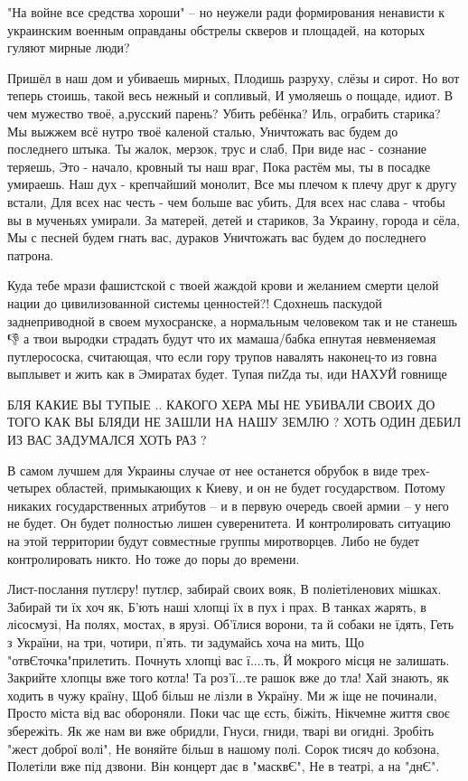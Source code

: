 "На войне все средства хороши" – но неужели ради формирования ненависти к
украинским военным оправданы обстрелы скверов и площадей, на которых гуляют
мирные люди?

Пришёл в наш дом и убиваешь мирных,
Плодишь разруху, слёзы и сирот.
Но вот теперь стоишь, такой весь нежный и сопливый,
И умоляешь о пощаде, идиот.
В чем мужество твоё, а,русский парень?
Убить ребёнка? Иль, ограбить старика?
Мы выжжем всё нутро твоё каленой сталью,
Уничтожать вас будем до последнего штыка.
Ты жалок, мерзок, трус и слаб,
При виде нас - сознание теряешь,
Это - начало, кровный ты наш враг,
Пока растём мы, ты в посадке умираешь.
Наш дух - крепчайший монолит,
Все мы плечом к плечу друг к другу встали,
Для всех нас честь - чем больше вас убить,
Для всех нас слава - чтобы вы в мученьях умирали.
За матерей, детей и стариков,
За Украину, города и сёла,
Мы с песней будем гнать вас, дураков
Уничтожать вас будем до последнего патрона.

Куда тебе мрази фашистской с твоей жаждой крови и желанием смерти целой нации
до цивилизованной системы ценностей?! Сдохнешь паскудой заднеприводной в своем
мухосранске, а нормальным человеком так и не станешь💩👎 а твои выродки
страдать будут что их мамаша/бабка епнутая невменяемая путлерососка, считающая,
что если гору трупов навалять наконец-то из говна выплывет и жить как в
Эмиратах будет. Тупая пиZда ты, иди НАХУЙ говнище

БЛЯ КАКИЕ ВЫ ТУПЫЕ .. КАКОГО ХЕРА МЫ НЕ УБИВАЛИ СВОИХ ДО ТОГО КАК ВЫ БЛЯДИ НЕ
ЗАШЛИ НА НАШУ ЗЕМЛЮ ? ХОТЬ ОДИН ДЕБИЛ ИЗ ВАС ЗАДУМАЛСЯ ХОТЬ РАЗ ?

В самом лучшем для Украины случае от нее останется обрубок в виде трех-четырех
областей, примыкающих к Киеву, и он не будет государством. Потому никаких
государственных атрибутов – и в первую очередь своей армии – у него не будет.
Он будет полностью лишен суверенитета. И контролировать ситуацию на этой
территории будут совместные группы миротворцев. Либо не будет контролировать
никто. Но тоже до поры до времени.

Лист-послання путлєру!
путлєр, забирай своих вояк,
В поліетіленових мішках.
Забирай ти їх хоч як,
Б'ють наші хлопці їх в пух і прах.
В танках жарять, в лісосмузі,
На полях, мостах, в ярузі.
Об'їлися ворони, та й собаки не їдять,
Геть з України, на три, чотири, п'ять.
ти задумайсь хоча на мить,
Що "отвЄточка"прилетить.
Почнуть хлопці вас ї....ть,
Й мокрого місця не залишать.
Закрийте хлопцы вже того котла!
Та роз'ї...те рашок вже до тла!
Хай знають, як ходить в чужу країну,
Щоб більш не лізли в Україну.
Ми ж іще не починали,
Просто міста від вас обороняли.
Поки час ще єсть, біжіть,
Нікчемне життя своє збережіть.
Як же нам ви вже обридли,
Гнуси, гниди, тварі ви огидні.
Зробіть "жест доброї волі",
Не воняйте більш в нашому полі.
Сорок тисяч до кобзона,
Полетіли вже під дзвони.
Він концерт дає в "масквЄ",
Не в театрі, а на "днЄ".

